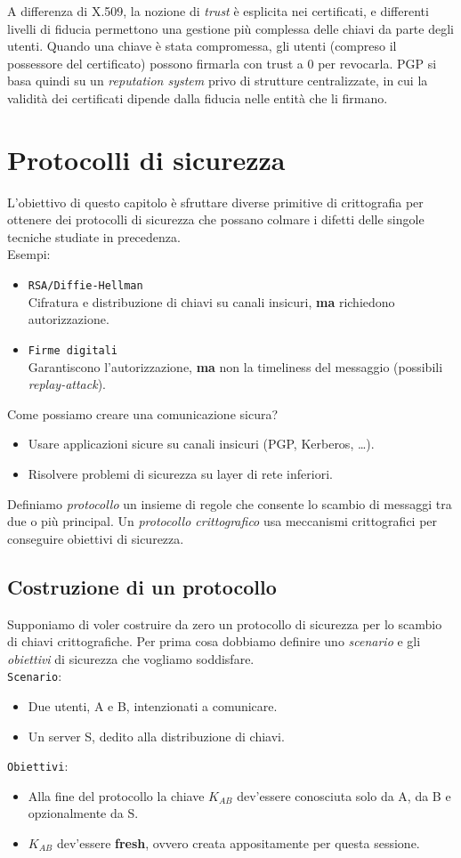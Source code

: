 \documentclass[a4paper, 11pt, notitlepage, fleqn]{report}
\begin{document}
A differenza di X.509, la nozione di \emph{trust} è esplicita nei certificati, e differenti livelli di fiducia permettono una gestione più complessa delle chiavi da parte degli utenti. Quando una chiave è stata compromessa, gli utenti (compreso il possessore del certificato) possono firmarla con trust a 0 per revocarla. PGP si basa quindi su un \emph{reputation system} privo di strutture centralizzate, in cui la validità dei certificati dipende dalla fiducia nelle entità che li firmano.


\chapter{Protocolli di sicurezza}
L'obiettivo di questo capitolo è sfruttare diverse primitive di crittografia per ottenere dei protocolli di sicurezza che possano colmare i difetti delle singole tecniche studiate in precedenza.\\
Esempi:
\begin{itemize}
	\item \texttt{RSA/Diffie-Hellman}\\
	Cifratura e distribuzione di chiavi su canali insicuri,
	\textbf{ma} richiedono autorizzazione.
	\item \texttt{Firme digitali}\\
	Garantiscono l'autorizzazione,
	\textbf{ma} non la timeliness del messaggio (possibili \emph{replay-attack}).
\end{itemize}
Come possiamo creare una comunicazione sicura?
\begin{itemize}
	\item Usare applicazioni sicure su canali insicuri (PGP, Kerberos, \dots).
	\item Risolvere problemi di sicurezza su layer di rete inferiori.
\end{itemize}
Definiamo \emph{protocollo} un insieme di regole che consente lo scambio di messaggi tra due o più principal. Un \emph{protocollo crittografico} usa meccanismi crittografici per conseguire obiettivi di sicurezza.

\section{Costruzione di un protocollo}
Supponiamo di voler costruire da zero un protocollo di sicurezza per lo scambio di chiavi crittografiche. Per prima cosa dobbiamo definire uno \emph{scenario} e gli \emph{obiettivi} di sicurezza che vogliamo soddisfare.\\
\texttt{Scenario}:
\begin{itemize}
	\item Due utenti, A e B, intenzionati a comunicare.
	\item Un server S, dedito alla distribuzione di chiavi.
\end{itemize}
\texttt{Obiettivi}:
\begin{itemize}
	\item Alla fine del protocollo la chiave $K_{AB}$ dev'essere conosciuta solo da A, da B e opzionalmente da S.
	\item $K_{AB}$ dev'essere \textbf{fresh}, ovvero creata appositamente per questa sessione.
\end{itemize}
\end{document}
